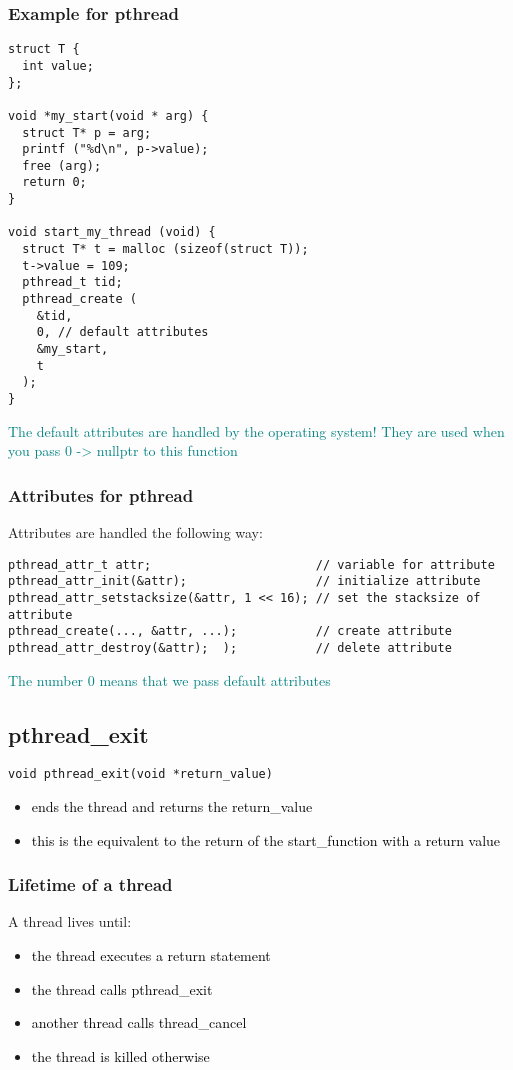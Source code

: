 \documentclass[main.tex,fontsize=8pt,paper=a4,paper=portrait,DIV=calc,]{scrartcl}
\begin{document}
\subsubsection{Example for pthread}
\begin{lstlisting}
struct T {
  int value;
};

void *my_start(void * arg) {
  struct T* p = arg;
  printf ("%d\n", p->value);
  free (arg);
  return 0;
}

void start_my_thread (void) {
  struct T* t = malloc (sizeof(struct T));
  t->value = 109;
  pthread_t tid;
  pthread_create (
    &tid,
    0, // default attributes
    &my_start,
    t
  );
}
\end{lstlisting}
\textcolor{teal}{The default attributes are handled by the operating system!\newline
They are used when you pass 0 -> nullptr to this function}

\subsubsection{Attributes for pthread}
Attributes are handled the following way:
\begin{lstlisting}
pthread_attr_t attr;                       // variable for attribute
pthread_attr_init(&attr);                  // initialize attribute
pthread_attr_setstacksize(&attr, 1 << 16); // set the stacksize of attribute
pthread_create(..., &attr, ...);           // create attribute
pthread_attr_destroy(&attr);  );           // delete attribute
\end{lstlisting}
\textcolor{teal}{The number 0 means that we pass default attributes}

\subsection{pthread\_exit}
\begin{lstlisting}
void pthread_exit(void *return_value)
\end{lstlisting}
\begin{itemize}
\item \textcolor{black}{ends the thread and returns the return\_value}
\item \textcolor{black}{this is the equivalent to the return of the start\_function with a return value}
\end{itemize} 

\subsubsection{Lifetime of a thread}
A thread lives until:
\begin{itemize}
  \item \textcolor{black}{the thread executes a return statement}
\item \textcolor{black}{the thread calls pthread\_exit}
\item \textcolor{black}{another thread calls thread\_cancel}
\item \textcolor{black}{the thread is killed otherwise}
\end{itemize} 
\end{document}
